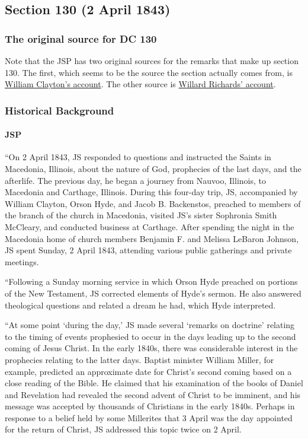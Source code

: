 \subsection{Section 130 (2 April 1843)}
	\label{DC130}
	
	\subsubsection{The original source for DC 130}
	
		Note that the JSP has two original sources for the remarks that make up section 130. The first, which seems to be the source the section actually comes from, is \hyperref[EMS-1843-JS-2-APR-1843-WC]{William Clayton's account}. The other source is \hyperref[EMS-1843-JS-2-APR-1843-WR]{Willard Richards' account}.
	
	\subsubsection{Historical Background}
		\label{DC130-HB}
		
		\paragraph{JSP}
		
			``On 2 April 1843, JS responded to questions and instructed the Saints in Macedonia, Illinois, about the nature of God, prophecies of the last days, and the afterlife. The previous day, he began a journey from Nauvoo, Illinois, to Macedonia and Carthage, Illinois. During this four-day trip, JS, accompanied by William Clayton, Orson Hyde, and Jacob B. Backenstos, preached to members of the branch of the church in Macedonia, visited JS's sister Sophronia Smith McCleary, and conducted business at Carthage. After spending the night in the Macedonia home of church members Benjamin F. and Melissa LeBaron Johnson, JS spent Sunday, 2 April 1843, attending various public gatherings and private meetings.

			``Following a Sunday morning service in which Orson Hyde preached on portions of the New Testament, JS corrected elements of Hyde's sermon. He also answered theological questions and related a dream he had, which Hyde interpreted. 
			
			``At some point `during the day,' JS made several `remarks on doctrine' relating to the timing of events prophesied to occur in the days leading up to the second coming of Jesus Christ. In the early 1840s, there was considerable interest in the prophecies relating to the latter days. Baptist minister William Miller, for example, predicted an approximate date for Christ's second coming based on a close reading of the Bible. He claimed that his examination of the books of Daniel and Revelation had revealed the second advent of Christ to be imminent, and his message was accepted by thousands of Christians in the early 1840s. Perhaps in response to a belief held by some Millerites that 3 April was the day appointed for the return of Christ, JS addressed this topic twice on 2 April.
			
